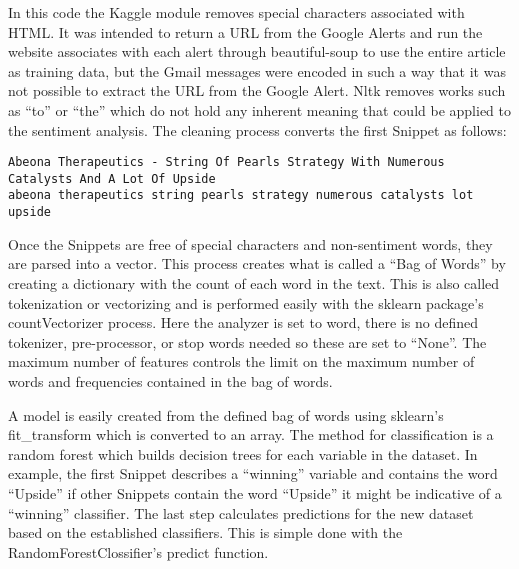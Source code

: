 \documentclass[sigconf]{acmart}
\begin{document}
In this code the Kaggle module removes special characters associated with HTML. It was intended to return a URL from the Google Alerts and run the website associates with each alert through beautiful-soup to use the entire article as training data, but the Gmail messages were encoded in such a way that it was not possible to extract the URL from the Google Alert. Nltk removes works such as ``to'' or ``the'' which do not hold any inherent meaning that could be applied to the sentiment analysis. The cleaning process converts the first Snippet as follows:
\begin{lstlisting}
Abeona Therapeutics - String Of Pearls Strategy With Numerous Catalysts And A Lot Of Upside
abeona therapeutics string pearls strategy numerous catalysts lot upside
\end{lstlisting}

Once the Snippets are free of special characters and non-sentiment words, they are parsed into a vector. This process creates what is called a ``Bag of Words'' by creating a dictionary with the count of each word in the text. This is also called tokenization or vectorizing and is performed easily with the sklearn package's countVectorizer process. Here the analyzer is set to word, there is no defined tokenizer, pre-processor, or stop words needed so these are set to ``None''. The maximum number of features controls the limit on the maximum number of words and frequencies contained in the bag of words. 

A model is easily created from the defined bag of words using sklearn's fit\_transform which is converted to an array. The method for classification is a random forest which builds decision trees for each variable in the dataset. In example, the first Snippet describes a ``winning'' variable and contains the word ``Upside'' if other Snippets contain the word ``Upside'' it might be indicative of a ``winning'' classifier. The last step calculates predictions for the new dataset based on the established classifiers. This is simple done with the RandomForestClossifier's predict function.
\end{document}
